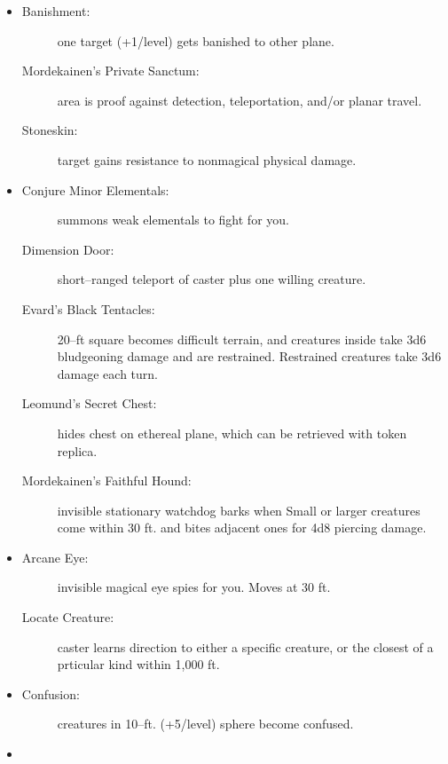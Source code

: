\documentclass[DIV=14, paper=a4, fontsize=12pt, twocolumn, twoside]{scrartcl}
\begin{document}
\begin{itemize}[align=parleft,labelwidth=1cm]
	\renewcommand{\labelitemi}{Abjur}\item
	\begin{description}
 \item[Banishment:] one target (+1/level) gets banished to other plane.
 \item[Mordekainen’s Private Sanctum:] area is proof against detection, teleportation, and/or planar travel.
 \item[Stoneskin:] target gains resistance to nonmagical physical damage.
\end{description}
\renewcommand{\labelitemi}{Conj}\item
\begin{description}
 \item[Conjure Minor Elementals:] summons weak elementals to fight for you.
 \item[Dimension Door:] short–ranged teleport of caster plus one willing creature.
 \item[Evard’s Black Tentacles:] 20–ft square becomes difficult terrain, and creatures inside take 3d6 bludgeoning damage and are restrained. Restrained creatures take 3d6 damage each turn.
 \item[Leomund’s Secret Chest:] hides chest on ethereal plane, which can be retrieved with token replica.
 \item[Mordekainen’s Faithful Hound:] invisible stationary watchdog barks when Small or larger creatures come within 30 ft. and bites adjacent ones for 4d8 piercing damage.
\end{description}
\renewcommand{\labelitemi}{Div}\item
\begin{description}
 \item[Arcane Eye:] invisible magical eye spies for you. Moves at 30 ft.
 \item[Locate Creature:] caster learns direction to either a specific creature, or the closest of a prticular kind within 1,000 ft.
\end{description}
\renewcommand{\labelitemi}{Ench}\item
\begin{description}
 \item[Confusion:] creatures in 10–ft. (+5/level) sphere become confused.
\end{description}
\renewcommand{\labelitemi}{Evoc}\item
\begin{description}

\end{description}
\end{itemize}
\end{document}
